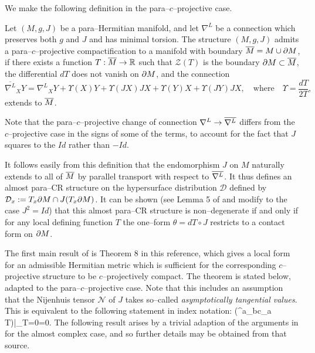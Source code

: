 We make the following definition in the para--$c$--projective case.

\begin{defi}
\label{defi_1}  Let $(M,g,J)$ be a  para--Hermitian manifold, and let $\nabla^L$ be a connection which preserves both $g$ and $J$ and has minimal torsion. The structure $(M, g, J)$
admits a para--$c$--projective compactification to a manifold with boundary $\overline{M}=M\cup\partial M$,
if there exists a function $T:\overline{M}\rightarrow \mathbb{R}$ such that $\mathcal{Z}(T)$ is the boundary
$\partial M\subset \overline{M}$, the differential $dT$ does not vanish on $\partial M$, and the
connection
\[
\overline{\nabla^L}_X Y={\nabla^L}_X Y+\Upsilon(X)Y+\Upsilon(JX)JX
+\Upsilon(Y)X+\Upsilon(JY)JX, \quad\mbox{where}\quad\Upsilon=\frac{dT}{2T},
\]
extends to $\overline{M}$.
\end{defi}

Note that the para--$c$--projective change of connection $\nabla^L\rightarrow \overline{\nabla^L}$ differs from the $c$--projective case in the signs of some of the terms, to account for the fact that $J$ squares to the $Id$ rather than $-Id$.

It follows easily from this definition that the endomorphism $J$ on $M$ naturally extends to all of $\overline{M}$ by parallel transport with respect to $\overline{\nabla^L}$. It thus defines an almost para--CR structure on the hypersurface distribution $\mathcal{D}$ defined by $\mathcal{D}_x:=T_x\partial M \cap J(T_x \partial M)$. It can be shown (see Lemma 5 of \cite{CG} and modify to the case $J^2=Id$) that this almost para--CR structure is non--degenerate if and only if for any local defining function $T$ the one--form $\theta=dT\circ J$ restricts to a contact form on $\partial M$.

The first main result of \cite{CG} is  Theorem 8 in this reference, which gives a local form for an admissible Hermitian metric which is sufficient for the corresponding $c$--projective structure to be $c$--projectively compact. The theorem is stated below, adapted to the para--$c$--projective case. Note that this includes an assumption that the Nijenhuis tensor $\mathcal{N}$ of $J$ takes so--called \textit{asymptotically tangential values}. This is equivalent to the following statement in index notation:
\be
\label{Nijenhuis_condition}
\Big({^{a}}_{bc}\nabla_a T\Big)|_{T=0}=0.  \ee
The
following result arises by a trivial adaption of the arguments in
\cite{CG} for the almost complex case, and so further details may be obtained from that source.

